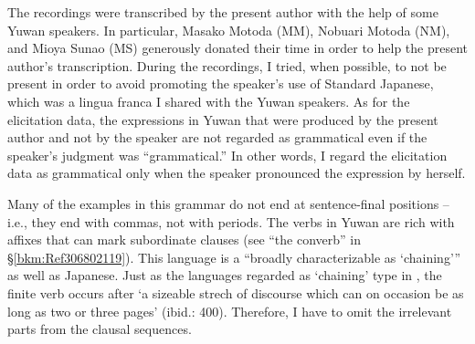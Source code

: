\begin{table}
\caption{\label{tab:key:3}Information about the Yuwan speakers}
\end{table}


The recordings were transcribed by the present author with the help of some Yuwan speakers. In particular, Masako Motoda (MM), Nobuari Motoda (NM), and Mioya Sunao (MS) generously donated their time in order to help the present author’s transcription. During the recordings, I tried, when possible, to not be present in order to avoid promoting the speaker’s use of Standard Japanese, which was a lingua franca I shared with the Yuwan speakers. As for the elicitation data, the expressions in Yuwan that were produced by the present author and not by the speaker are not regarded as grammatical even if the speaker’s judgment was “grammatical.” In other words, I regard the elicitation data as grammatical only when the speaker pronounced the expression by herself.

Many of the examples in this grammar do not end at sentence-final positions -- i.e., they end with commas, not with periods. The verbs in Yuwan are rich with affixes that can mark subordinate clauses (see “the converb” in §\ref{bkm:Ref306802119}). This language is a “broadly characterizable as ‘chaining’” \citep[399]{Longacre2007} as well as Japanese. Just as the languages regarded as ‘chaining’ type in \citet{Longacre2007}, the finite verb occurs after ‘a sizeable strech of discourse which can on occasion be as long as two or three pages’ (ibid.: 400). Therefore, I have to omit the irrelevant parts from the clausal sequences.

